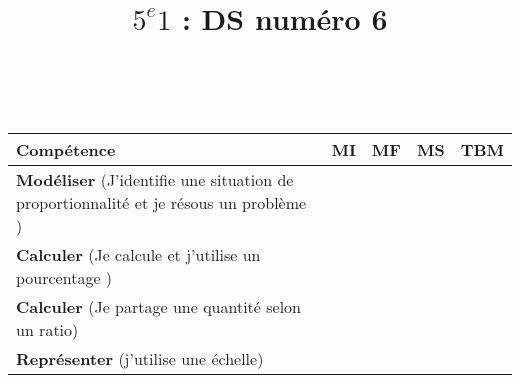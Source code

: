 \documentclass[a4paper,11pt]{exam}
\author{\ }
\date{}
\title{$5^e 1$ : DS num\'ero 6}
\begin{document}
%	

	\maketitle
%	

\begin{small}
	\begin{center}
		\begin{tabular}{|@{\ }l@{\ }|@{\ }c@{\ }|@{\ }c@{\ }|@{\ }c@{\ }|@{\ }c@{\ }|}
			\hline
			\textbf{Compétence} & \textbf{MI} & \textbf{MF} & \textbf{MS} & \textbf{TBM} \\
			\hline
			\textbf{Modéliser} (J'identifie une situation de proportionnalité et je résous un problème ) &  \ \ & \ \ & \ \ & \ \  \\
			\hline
			\textbf{Calculer} (Je calcule et j'utilise un pourcentage ) &  \ \ & \ \ & \ \ & \ \  \\
			\hline
			\textbf{Calculer} (Je partage une quantité selon un ratio)&  \ \ & \ \ & \ \ & \ \  \\
			\hline	
			\textbf{Représenter} (j’utilise une échelle) & \ \ & \ \ &  \ \  & \ \ \\
			\hline
%			 
		\end{tabular}
	\end{center}
\end{small}	

	





\newpage








\label{LastPage}

%
\end{document}
